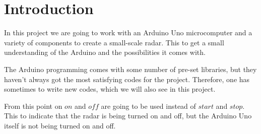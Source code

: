 \chapter{Introduction}
In this project we are going to work with an Arduino Uno microcomputer and a variety of components to create a small-scale radar. This to get a small understanding of the Arduino and the possibilities it comes with.  

The Arduino programming comes with some number of pre-set libraries, but they haven't always got the most satisfying codes for the project. Therefore, one has sometimes to write new codes, which we will also see in this project. 

From this point on $on$ and $off$ are going to be used instead of $start$ and $stop$. This to indicate that the radar is being turned on and off, but the Arduino Uno itself is not being turned on and off. 